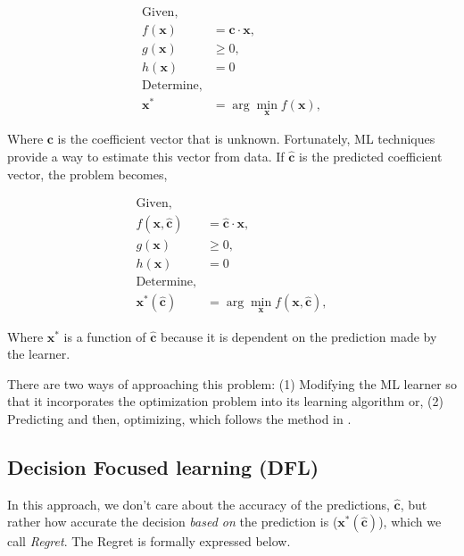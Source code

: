 \documentclass[12pt, letterpaper]{article}
\begin{document}


\begin{align}
    \text{Given,}  & \\
    f(\mathbf{x}) &= \mathbf{c} \cdot \mathbf{x}, \\
    g(\mathbf{x}) &\geq 0, \\
    h(\mathbf{x}) &= 0 \\
    \text{Determine,} & \\
    \mathbf{x}^* &= \arg \min_{\mathbf{x}} f(\mathbf{x}),
\end{align}

Where $\mathbf{c}$ is the coefficient vector that is unknown. Fortunately, ML
techniques provide a way to estimate this vector from data. If
$\hat{\mathbf{c}}$ is the predicted coefficient vector, the problem becomes,

\begin{align}
    \text{Given,}  & \\
    f(\mathbf{x}, \hat{\mathbf{c}}) &= \hat{\mathbf{c}} \cdot \mathbf{x}, \\
    g(\mathbf{x}) &\geq 0, \\
    h(\mathbf{x}) &= 0 \\
    \text{Determine,} & \\
    \mathbf{x}^*(\hat{\mathbf{c}}) &= \arg \min_{\mathbf{x}} f(\mathbf{x}, \hat{\mathbf{c}}),
\end{align}

Where $\mathbf{x}^*$ is a function of $\hat{\mathbf{c}}$ because it is dependent
on the prediction made by the learner. 

There are two ways of approaching this problem: (1) Modifying the ML learner so
that it incorporates the optimization problem into its learning algorithm or,
(2) Predicting and then, optimizing, which follows the method in \cite{spo}.

\subsection{Decision Focused learning (DFL)}
In this approach, we don't care about the accuracy of the predictions,
$\hat{\mathbf{c}}$, but rather how accurate the decision \textit{based on} the
prediction is ($\mathbf{x}^*(\hat{\mathbf{c}})$), which we call \textit{Regret}.
The Regret is formally expressed below.
\end{document}
